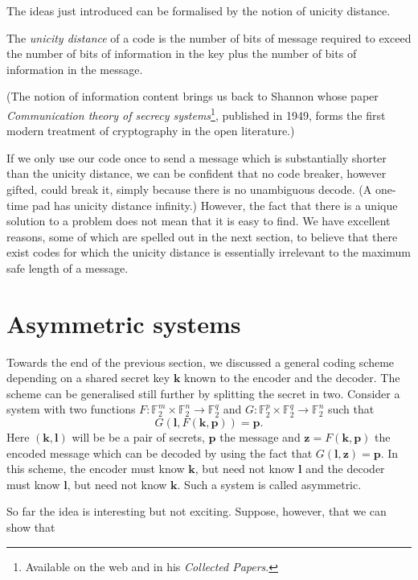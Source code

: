 The ideas just introduced can be formalised
by the notion of unicity distance.
\begin{definition}\label{unicity}
The \emph{unicity distance}
of a code is the number of bits of message
required to exceed the number of bits of
information in the key plus the number
of bits of information in the message.
\end{definition}

(The notion of information content
brings us back to Shannon whose paper
\emph{Communication theory of secrecy systems}\footnote{Available
on the web and in his \emph{Collected Papers}.},
published in 1949, forms the first modern treatment
of cryptography in the open literature.) 

If we only use our code once to send a message
which is substantially shorter than the unicity
distance, we can be confident that no code breaker,
however gifted, could break it, simply because
there is no unambiguous decode.
(A one-time pad has unicity distance infinity.)
However, the fact that there is a unique solution
to a problem does not mean that it is easy
to find.
We have excellent reasons, some of which
are spelled out in the next section, to believe that
there exist codes for which the unicity distance
is essentially irrelevant to the maximum safe length
of a message.
\section{Asymmetric systems}\label{S;symmetric} Towards the end
of the previous section, we discussed a general
coding scheme depending on a shared secret
key ${\mathbf k}$ known to the encoder
and the decoder. The scheme can be generalised
still further by splitting the secret in two.
Consider a system
with two functions
$F:{\mathbb F}_{2}^{m}\times{\mathbb F}_{2}^{n}
\rightarrow{\mathbb F}_{2}^{q}$ and
$G:{\mathbb F}_{2}^{p}\times{\mathbb F}_{2}^{q}
\rightarrow{\mathbb F}_{2}^{n}$
such that
\[G({\mathbf l},F({\mathbf k},{\mathbf p}))={\mathbf p}.\]
Here $({\mathbf k},{\mathbf l})$ will be
be a pair of secrets, ${\mathbf p}$ the message and
${\mathbf z}=F({\mathbf k},{\mathbf p})$ the
encoded message which can be decoded by
using the fact that $G({\mathbf l},{\mathbf z})
={\mathbf p}$. In this scheme, the encoder
must know ${\mathbf k}$, but need not know ${\mathbf l}$
and the decoder must know ${\mathbf l}$,
but need not know ${\mathbf k}$. Such a system
is called asymmetric.

So far the idea is interesting but not exciting.
Suppose, however, that we can show that

